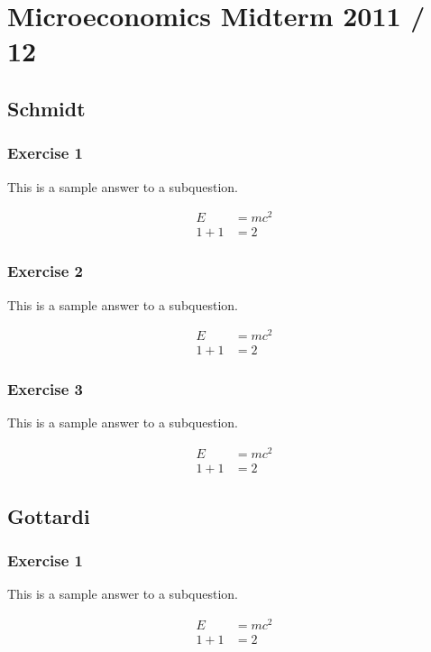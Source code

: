 \section*{Microeconomics Midterm 2011 / 12}

{
\subsection*{Schmidt}

{
\subsubsection*{Exercise 1}

\begin{enumerate}[label=(\alph*)]
{\item 
This is a sample answer to a subquestion.

\begin{align*}
    E &= mc^2 \\
    1 + 1 &= 2
\end{align*}
}
\end{enumerate}
}
{
\subsubsection*{Exercise 2}

\begin{enumerate}[label=(\alph*)]
{\item 
This is a sample answer to a subquestion.

\begin{align*}
    E &= mc^2 \\
    1 + 1 &= 2
\end{align*}
}
\end{enumerate}
}
{
\subsubsection*{Exercise 3}

\begin{enumerate}[label=(\alph*)]
{\item 
This is a sample answer to a subquestion.

\begin{align*}
    E &= mc^2 \\
    1 + 1 &= 2
\end{align*}
}
\end{enumerate}
}
}

\newpage
{
\subsection*{Gottardi}

\subsubsection*{Exercise 1}

\begin{enumerate}[label=(\alph*)]
{\item 
This is a sample answer to a subquestion.

\begin{align*}
    E &= mc^2 \\
    1 + 1 &= 2
\end{align*}
}
\end{enumerate}
}
